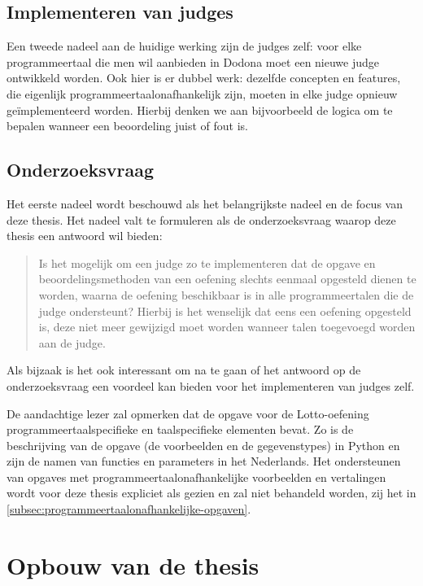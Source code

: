 \subsection{Implementeren van judges}\label{subsec:implementeren-van-judges}

Een tweede nadeel aan de huidige werking zijn de judges zelf: voor elke programmeertaal die men wil aanbieden in Dodona moet een nieuwe judge ontwikkeld worden.
Ook hier is er dubbel werk: dezelfde concepten en features, die eigenlijk programmeertaalonafhankelijk zijn, moeten in elke judge opnieuw geïmplementeerd worden.
Hierbij denken we aan bijvoorbeeld de logica om te bepalen wanneer een beoordeling juist of fout is.

\subsection{Onderzoeksvraag}\label{subsec:onderzoeksvraag}

Het eerste nadeel wordt beschouwd als het belangrijkste nadeel en de focus van deze thesis.
Het nadeel valt te formuleren als de onderzoeksvraag waarop deze thesis een antwoord wil bieden:

\begin{quote}
    Is het mogelijk om een judge zo te implementeren dat de opgave en beoordelingsmethoden van een oefening slechts eenmaal opgesteld dienen te worden, waarna de oefening beschikbaar is in alle programmeertalen die de judge ondersteunt?
    Hierbij is het wenselijk dat eens een oefening opgesteld is, deze niet meer gewijzigd moet worden wanneer talen toegevoegd worden aan de judge.
\end{quote}

Als bijzaak is het ook interessant om na te gaan of het antwoord op de onderzoeksvraag een voordeel kan bieden voor het implementeren van judges zelf.

De aandachtige lezer zal opmerken dat de opgave voor de Lotto-oefening programmeertaalspecifieke en taalspecifieke elementen bevat.
Zo is de beschrijving van de opgave (de voorbeelden en de gegevenstypes) in Python en zijn de namen van functies en parameters in het Nederlands.
Het ondersteunen van opgaves met programmeertaalonafhankelijke voorbeelden en vertalingen wordt voor deze thesis expliciet als  gezien en zal niet behandeld worden, zij het in \cref{subsec:programmeertaalonafhankelijke-opgaven}.

\section{Opbouw van de thesis}\label{sec:opbouw}

